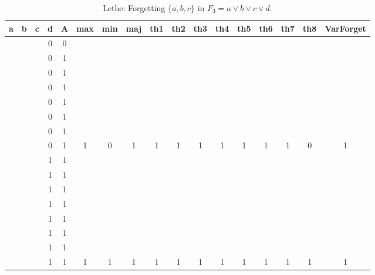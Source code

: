 \begin{table}[!tb]
    \centering
    \begin{tabular}{|c|c|c|c|c|c|c|c|c|c|c|c|c|c|c|c|c|}
        \hline
        \textbf{a} & \textbf{b} & \textbf{c} & \textbf{d} & \textbf{A} & \textbf{max} & \textbf{min} & \textbf{maj} & \textbf{th1} & \textbf{th2} & \textbf{th3} & \textbf{th4} & \textbf{th5} & \textbf{th6} & \textbf{th7} & \textbf{th8} & \textbf{VarForget} \\ \hline
        \rowcolor{gray!40}  &  &  & 0 & 0 &  &  &  &  &  &  &  &  &  &  &  &  \\ \hline
        \rowcolor{gray!40}  &  &  & 0 & 1 &  &  &  &  &  &  &  &  &  &  &  &  \\ \hline
        \rowcolor{gray!40}  &  &  & 0 & 1 &  &  &  &  &  &  &  &  &  &  &  &  \\ \hline
        \rowcolor{gray!40}  &  &  & 0 & 1 &  &  &  &  &  &  &  &  &  &  &  &  \\ \hline
        \rowcolor{gray!40}  &  &  & 0 & 1 &  &  &  &  &  &  &  &  &  &  &  &  \\ \hline
        \rowcolor{gray!40}  &  &  & 0 & 1 &  &  &  &  &  &  &  &  &  &  &  &  \\ \hline
        \rowcolor{gray!40}  &  &  & 0 & 1 &  &  &  &  &  &  &  &  &  &  &  &  \\ \hline
        \rowcolor{gray!40}  &  &  & 0 & 1 & 1 & 0 & 1 & 1 & 1 & 1 & 1 & 1 & 1 & 1 & 0 & 1 \\ \hline
        \rowcolor{blue!40}  &  &  & 1 & 1 &  &  &  &  &  &  &  &  &  &  &  &  \\ \hline
        \rowcolor{blue!40}  &  &  & 1 & 1 &  &  &  &  &  &  &  &  &  &  &  &  \\ \hline
        \rowcolor{blue!40}  &  &  & 1 & 1 &  &  &  &  &  &  &  &  &  &  &  &  \\ \hline
        \rowcolor{blue!40}  &  &  & 1 & 1 &  &  &  &  &  &  &  &  &  &  &  &  \\ \hline
        \rowcolor{blue!40}  &  &  & 1 & 1 &  &  &  &  &  &  &  &  &  &  &  &  \\ \hline
        \rowcolor{blue!40}  &  &  & 1 & 1 &  &  &  &  &  &  &  &  &  &  &  &  \\ \hline
        \rowcolor{blue!40}  &  &  & 1 & 1 &  &  &  &  &  &  &  &  &  &  &  &  \\ \hline
        \rowcolor{blue!40}  &  &  & 1 & 1 & 1 & 1 & 1 & 1 & 1 & 1 & 1 & 1 & 1 & 1 & 1 & 1 \\ \hline
    \end{tabular}
    \caption{Lethe: Forgetting $\{a, b, c\}$ in $F_{3} = a \lor b \lor c \lor d$.}
    \label{tab:lethe-F3-abc}
\end{table}
